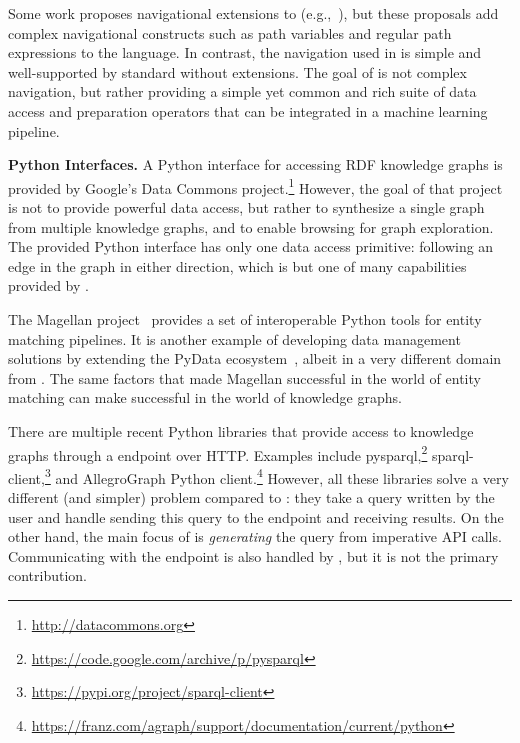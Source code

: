 Some work proposes navigational extensions to \sparql (e.g.,~\cite{nsparql, sparqler}), but these proposals add complex navigational constructs such as path variables
and regular path expressions to the language.
In contrast, the navigation used in \rdfframes is simple and well-supported by standard \sparql
without extensions.
The goal of \rdfframes is not complex navigation, but rather providing a simple yet common and rich suite of data access and preparation operators that can be integrated in a machine learning pipeline.

\vspace{4pt}
\noindent
\textbf{Python Interfaces.}
A Python interface for accessing RDF knowledge graphs is provided by
Google's Data Commons project.\footnote{\url{http://datacommons.org}}
However, the goal of that project is not to provide powerful data access, but rather to synthesize a single graph from multiple knowledge graphs, and to enable browsing for graph exploration.
The provided Python interface has only one data access primitive: following an edge in the graph in either direction, which is but one of many capabilities provided by \rdfframes.


The Magellan project~\cite{magellan} provides a set of interoperable Python tools for entity matching pipelines. It is another example of developing data management solutions by extending the PyData ecosystem~\cite{anhai_hilda}, albeit in a very different domain from \rdfframes. The same factors that made Magellan successful in the world of entity matching can make \rdfframes successful in the world of knowledge graphs. 

There are multiple recent Python libraries that provide access to knowledge graphs through a \sparql endpoint over HTTP.
Examples include
pysparql,\footnote{\url{https://code.google.com/archive/p/pysparql}}
sparql-client,\footnote{\url{https://pypi.org/project/sparql-client}}
and 
AllegroGraph Python client.\footnote{\url{https://franz.com/agraph/support/documentation/current/python}}
However, all these libraries solve a very different (and simpler) problem compared to \rdfframes: they take a \sparql query written by the user and handle sending this query to the endpoint and receiving results. On the other hand, the main focus of \rdfframes is \textit{generating} the \sparql query from imperative API calls. Communicating with the endpoint is also handled by \rdfframes, but it is not the primary contribution.



